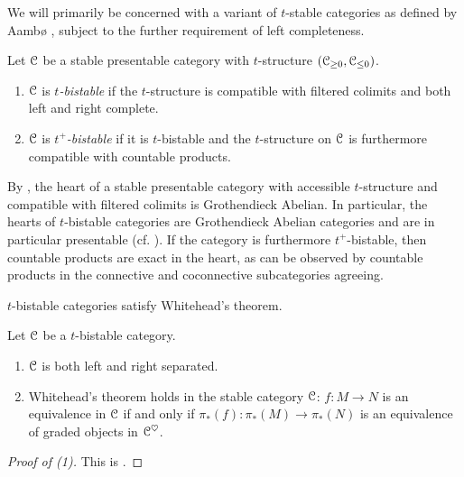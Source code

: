 We will primarily be concerned with a variant of $t$-stable categories as defined by Aambø \cite[Def. 2.22]{LocalizingTStruct}, subject to the further requirement of left completeness. 
\begin{definition}\label{def: t-bistable category}
    Let $\EuScript{C}$ be a stable presentable category with $t$-structure $(\EuScript{C}_{\geq0},\EuScript{C}_{\leq0})$. 
    \begin{enumerate}
        \item $\EuScript{C}$ is \emph{$t$-bistable} if the $t$-structure is compatible with filtered colimits and both left and right complete. 
        \item $\EuScript{C}$ is \emph{$t^{+}$-bistable} if it is $t$-bistable and the $t$-structure on $\EuScript{C}$ is furthermore compatible with countable products.  
    \end{enumerate} 
\end{definition}
\begin{remark}\label{rmk: hearts are Grothendieck}
    By \cite[Rmk. 1.3.5.23]{HA}, the heart of a stable presentable category with accessible $t$-structure and compatible with filtered colimits is Grothendieck Abelian. In particular, the hearts of $t$-bistable categories are Grothendieck Abelian categories and are in particular presentable (cf. \cite[Prop. 3.10]{BekeModel}). If the category is furthermore $t^{+}$-bistable, then countable products are exact in the heart, as can be observed by countable products in the connective and coconnective subcategories agreeing.  
\end{remark}
$t$-bistable categories satisfy Whitehead's theorem. 
\begin{lemma}\label{lem: separatedness and prestable}
    Let $\EuScript{C}$ be a $t$-bistable category. 
    \begin{enumerate}
        \item $\EuScript{C}$ is both left and right separated. 
        \item Whitehead's theorem holds in the stable category $\EuScript{C}$: $f:M\to N$ is an equivalence in $\EuScript{C}$ if and only if $\pi_{*}(f):\pi_{*}(M)\to\pi_{*}(N)$ is an equivalence of graded objects in $\EuScript{C}^{\heartsuit}$. 
    \end{enumerate} 
\end{lemma}
\begin{proof}[Proof of (1)]
    This is \cite[Lem. 2.15]{AntieauEnhancements}. 
\end{proof}
